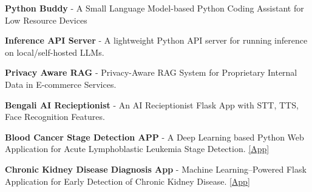 



\href{https://github.com/taufiq-ai/slm-python-buddy}{\faGithub} {{\fontsize{9pt}{1em}\bodyfont\color{text} \textbf{Python Buddy} }} {{\fontsize{8pt}{1em}\bodyfont\color{text}- A Small Language Model-based Python Coding Assistant for Low Resource Devices}} 

\href{https://github.com/taufiq-ai/slm-api-server}{\faGithub} {{\fontsize{9pt}{1em}\bodyfont\color{text} \textbf{Inference API Server} }} {{\fontsize{8pt}{1em}\bodyfont\color{text}- A lightweight Python API server for running inference on local/self-hosted LLMs.}} 

\href{https://github.com/taufiq-ai/Privacy-Aware-RAG}{\faGithub} {{\fontsize{9pt}{1em}\bodyfont\color{text} \textbf{Privacy Aware RAG} }} {{\fontsize{8pt}{1em}\bodyfont\color{text}- Privacy-Aware RAG System for Proprietary Internal Data in E-commerce Services.}} 


\href{https://github.com/taufiq-ai/Bengali-AI-Recieptionist}{\faGithub} {{\fontsize{9pt}{1em}\bodyfont\color{text} \textbf{Bengali AI Recieptionist} }} {{\fontsize{8pt}{1em}\bodyfont\color{text}- An AI Recieptionist Flask App with STT, TTS, Face Recognition Features.}} 


\href{https://github.com/taufiq-ai/Vision-Blood-Cancer-Stage-Detection}{\faGithub} {{\fontsize{9pt}{1em}\bodyfont\color{text} \textbf{Blood Cancer Stage Detection APP} }} {{\fontsize{8pt}{1em}\bodyfont\color{text}- A Deep Learning based Python Web Application for Acute Lymphoblastic Leukemia Stage Detection. \href{https://blood-cancer-stage-detection.onrender.com/}{\textcolor{Cerulean}{[App]}}}} 


\href{https://github.com/taufiq-ai/ML-Kidney-Disease-Diagnosis}{\faGithub} {{\fontsize{9pt}{1em}\bodyfont\color{text} \textbf{Chronic Kidney Disease Diagnosis App} }} {{\fontsize{8pt}{1em}\bodyfont\color{text}- Machine Learning–Powered Flask Application for Early Detection of Chronic Kidney Disease. \href{https://kidney-disease-diagnosis.onrender.com/}{\textcolor{Cerulean}{[App]}}}} 




